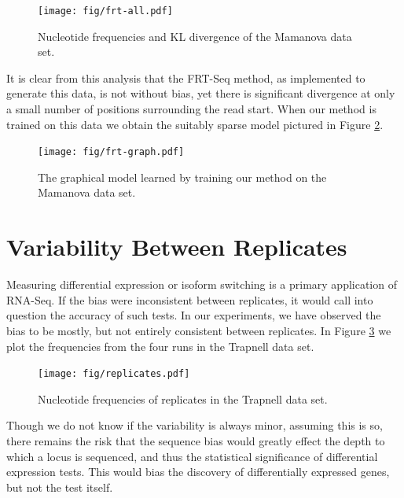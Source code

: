 \documentclass[letterpaper]{article}
\begin{document}
\begin{figure}[H]
\begin{center}
\texttt{[image: fig/frt-all.pdf]}
\end{center}
\caption{Nucleotide frequencies and KL divergence of the Mamanova data set.}
\label{fig:frtall}
\end{figure}

It is clear from this analysis that the FRT-Seq method, as implemented to
generate this data, is not without bias, yet there is significant divergence at
only a small number of positions surrounding the read start. When our method is
trained on this data we obtain the suitably sparse model pictured in Figure
\ref{fig:frtgraph}.

\begin{figure}[H]
\begin{center}
\texttt{[image: fig/frt-graph.pdf]}
\end{center}
\caption{The graphical model learned by training our method on the Mamanova data
set.}
\label{fig:frtgraph}
\end{figure}


\section{Variability Between Replicates}

Measuring differential expression or isoform switching is a primary application of
RNA-Seq. If the bias were inconsistent between replicates, it would call into
question the accuracy of such tests. In our experiments, we have observed the
bias to be mostly, but not entirely consistent between replicates. In Figure
\ref{fig:replicates} we
plot the frequencies from the four runs in the Trapnell data set.

\begin{figure}[H]
\begin{center}
\texttt{[image: fig/replicates.pdf]}
\end{center}
\caption{Nucleotide frequencies of replicates in the Trapnell data set.}
\label{fig:replicates}
\end{figure}

Though we do not know if the variability is always minor, assuming this is so,
there remains the risk that the sequence bias would greatly effect the depth to
which a locus is sequenced, and thus the statistical significance of
differential expression tests. This would bias the discovery of differentially
expressed genes, but not the test itself.
\end{document}
